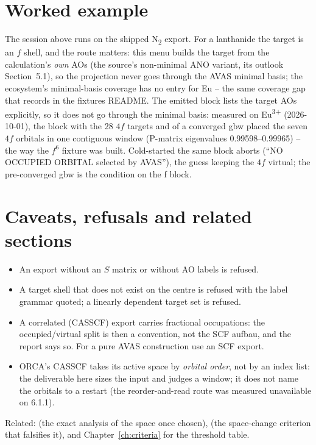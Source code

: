 \section{Worked example}

The session above runs on the shipped N\textsubscript{2} export. For a
lanthanide the target is an $f$ shell, and the route matters: this menu builds
the target from the calculation's \emph{own} AOs (the source's non-minimal
ANO variant, its outlook Section~5.1), so the projection never goes through
the AVAS minimal basis; the ecosystem's minimal-basis coverage has no entry
for Eu -- the same coverage gap that  records in the fixtures
README. The emitted
 block lists the target AOs explicitly, so it does not go
through the minimal basis: measured on Eu\textsuperscript{3+} (2026-10-01),
the block with the 28 $4f$ targets and  of a converged gbw
placed the seven $4f$ orbitals in one contiguous window (P-matrix eigenvalues
0.99598--0.99965) -- the way the $f^6$ fixture was built. Cold-started the
same block aborts (``NO OCCUPIED ORBITAL selected by AVAS''), the guess
keeping the $4f$ virtual; the pre-converged gbw is the condition on the f
block.

\section{Caveats, refusals and related sections}

\begin{refusalbox}
\begin{itemize}
  \item An export without an $S$ matrix or without AO labels is refused.
  \item A target shell that does not exist on the centre is refused with the
    label grammar quoted; a linearly dependent target set is refused.
  \item A correlated (CASSCF) export carries fractional occupations: the
    occupied/virtual split is then a convention, not the SCF aufbau, and the
    report says so. For a pure AVAS construction use an SCF export.
  \item ORCA's CASSCF takes its active space by \emph{orbital order}, not by
    an index list: the deliverable here sizes the input and judges a window;
    it does not name the orbitals to a restart (the reorder-and-read route was
    measured unavailable on 6.1.1).
\end{itemize}
\end{refusalbox}

Related:  (the exact analysis of the space once chosen),
 (the space-change criterion that falsifies it), and
Chapter~\ref{ch:criteria} for the threshold table.
